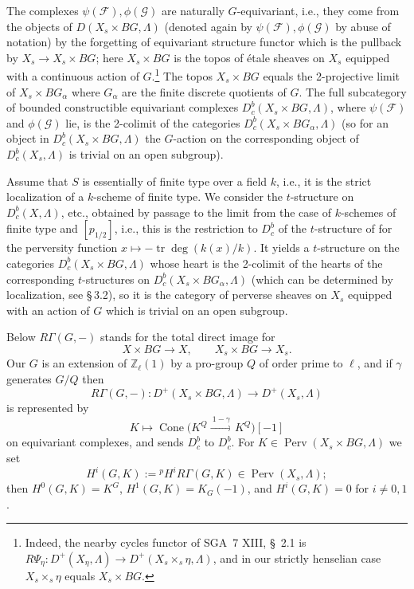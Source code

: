 \documentclass[12pt,oneside]{amsbook}
\theoremstyle{plain}
\theoremstyle{definition}
\newcommand{\FF}{\mathcal{F}}
\newcommand{\GG}{\mathcal{G}}
\newcommand{\Zl}{\mathbb{Z}_{\ell}}
\newcommand{\Dbc}{D^{b}_{c}}
\DeclareMathOperator{\Perv}{Perv}
\begin{document}
The complexes $\psi(\FF),\phi(\GG)$ are naturally $G$-equivariant, i.e., they come from the objects of $D(X_{s}\times BG,\Lambda)$ (denoted again by $\psi(\FF),\phi(\GG)$ by abuse of notation) by the forgetting of equivariant structure functor which is the pullback by $X_{s}\to X_{s}\times BG$; here $X_{s}\times BG$ is the topos of étale sheaves on $X_{s}$ equipped with a continuous action of $G$.\footnote{Indeed, the nearby cycles functor of SGA~7 XIII, \S~2.1 is $R\Psi_{\eta}:D^{+}(X_{\eta},\Lambda)\to D^{+}(X_{s}\times_{s}\eta,\Lambda)$, and in our strictly henselian case $X_{s}\times_{s}\eta$ equals $X_{s}\times BG$.} The topos $X_{s}\times BG$ equals the 2-projective limit of $X_{s}\times BG_{\alpha}$ where $G_{\alpha}$ are the finite discrete quotients of $G$. The full subcategory of bounded constructible equivariant complexes $\Dbc(X_{s}\times BG,\Lambda)$, where $\psi(\FF)$ and $\phi(\GG)$ lie, is the 2-colimit of the categories $\Dbc(X_{s}\times BG_{\alpha},\Lambda)$ (so for an object in $\Dbc(X_{s}\times BG,\Lambda)$ the $G$-action on the corresponding object of $\Dbc(X_{s},\Lambda)$ is trivial on an open subgroup).

Assume that $S$ is essentially of finite type over a field $k$, i.e., it is the strict localization of a $k$-scheme of finite type. We consider the $t$-structure on $\Dbc(X,\Lambda)$, etc., obtained by passage to the limit from the case of $k$-schemes of finite type and $[p_{1/2}]$, i.e., this is the restriction to $\Dbc$ of the $t$-structure of \cite{Gab04} for the perversity function $x\mapsto-\operatorname{tr}\deg(k(x)/k)$. It yields a $t$-structure on the categories $\Dbc(X_{s}\times BG,\Lambda)$ whose heart is the 2-colimit of the hearts of the corresponding $t$-structures on $\Dbc(X_{s}\times BG_{\alpha},\Lambda)$ (which can be determined by localization, see \S\,3.2), so it is the category of perverse sheaves on $X_{s}$ equipped with an action of $G$ which is trivial on an open subgroup.

Below $R\Gamma(G,-)$ stands for the total direct image for
\[
  X\times BG\to X,\qquad X_{s}\times BG\to X_{s}.
\]
Our $G$ is an extension of $\Zl(1)$ by a pro-group $Q$ of order prime to $\ell$, and if $\gamma$ generates $G/Q$ then
\[
  R\Gamma(G,-):D^{+}(X_{s}\times BG,\Lambda)\to D^{+}(X_{s},\Lambda)
\]
is represented by
\[
  K\longmapsto \operatorname{Cone}\bigl(K^{Q}\xrightarrow{\ 1-\gamma\ }K^{Q}\bigr)[-1]
\]
on equivariant complexes, and sends $\Dbc$ to $\Dbc$. For $K\in\Perv(X_{s}\times BG,\Lambda)$ we set
\[
  H^{i}(G,K):={}^{p}H^{i}R\Gamma(G,K)\in\Perv(X_{s},\Lambda);
\]
then $H^{0}(G,K)=K^{G}$, $H^{1}(G,K)=K_{G}(-1)$, and $H^{i}(G,K)=0$ for $i\neq0,1$.
\end{document}
